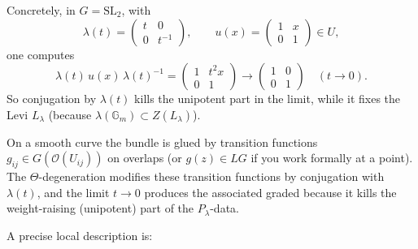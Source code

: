 \documentclass[12pt]{article}
\begin{document}
Concretely, in $G = \mathrm{SL}_2$, with
\[
\lambda(t) = \begin{pmatrix} t & 0 \\ 0 & t^{-1} \end{pmatrix}, \qquad u(x) = \begin{pmatrix} 1 & x \\ 0 & 1 \end{pmatrix} \in U,
\]
one computes
\[
\lambda(t) \, u(x) \, \lambda(t)^{-1} = \begin{pmatrix} 1 & t^{2} x \\ 0 & 1 \end{pmatrix} \longrightarrow \begin{pmatrix} 1 & 0 \\ 0 & 1 \end{pmatrix} \quad (t \to 0).
\]
So conjugation by $\lambda(t)$ kills the unipotent part in the limit, while it fixes the Levi $L_\lambda$ (because $\lambda(\mathbb{G}_m) \subset Z(L_\lambda)$).

On a smooth curve the bundle is glued by transition functions $g_{ij} \in G(\mathcal{O}(U_{ij}))$ on overlaps (or $g(z) \in LG$ if you work formally at a point). The $\Theta$-degeneration modifies these transition functions by conjugation with $\lambda(t)$, and the limit $t \to 0$ produces the associated graded because it kills the weight-raising (unipotent) part of the $P_\lambda$-data.

A precise local description is:
\end{document}
